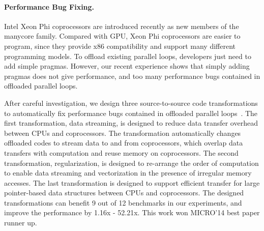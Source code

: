 \documentclass[10pt]{article}
\begin{document}
\vspace{-.1in}
\paragraph{Performance Bug Fixing.}
Intel Xeon Phi coprocessors are introduced recently as new members of the manycore family. 
Compared with GPU, Xeon Phi coprocessors are easier to program,
since they provide x86 compatibility and support many different programming models.
To offload existing parallel loops, developers just need to add simple pragmas. 
However, our recent experience shows that simply adding pragmas does not give performance, 
and too many performance bugs contained in offloaded parallel loops. 


After careful investigation, we design three source-to-source code transformations to 
automatically fix performance bugs contained in offloaded parallel loops~\cite{Song14MICRO}. 
The first transformation, data streaming, is designed to reduce data transfer overhead between CPUs and coprocessors. 
The transformation automatically changes offloaded codes to stream data to and from coprocessors, 
which overlap data transfers with computation and reuse memory on coprocessors.
The second transformation, regularization, is designed to re-arrange the order of computation to 
enable data streaming and vectorization in the presence of irregular memory accesses. 
The last transformation is designed to support efficient transfer for large pointer-based data structures between CPUs and coprocessors. 
The designed transformations can benefit 9 out of 12 benchmarks in our experiments, and improve the performance by 1.16x - 52.21x. 
This work won MICRO'14 best paper runner up.  
\end{document}
